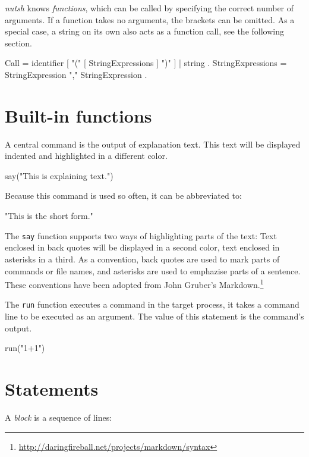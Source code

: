 \documentclass[paper=a4,twoside,abstract=on,cleardoublepage=empty,numbers=noenddot,toc=bib,12pt,appendixprefix=true]{scrreprt}
\begin{document}

\emph{nutsh} knows \emph{functions}, which can be called by specifying the correct number of arguments. If a function takes no arguments, the brackets can be omitted. As a special case, a string on its own also acts as a function call, see the following section.

\begin{ebnf}
Call = identifier [ "(" [ StringExpressions ] ")" ] | string .
StringExpressions = StringExpression { "," StringExpression } .
\end{ebnf}

\section{Built-in functions}

A central command is the output of explanation text. This text will be displayed indented and highlighted in a different color.

\begin{nutsh}
say("This is explaining text.")
\end{nutsh}
%
Because this command is used so often, it can be abbreviated to:

\begin{nutsh}
"This is the short form."
\end{nutsh}
%
The \texttt{say} function supports two ways of highlighting parts of the text: Text enclosed in back quotes will be displayed in a second color, text enclosed in asterisks in a third. As a convention, back quotes are used to mark parts of commands or file names, and asterisks are used to emphazise parts of a sentence. These conventions have been adopted from John Gruber's Markdown.\footnote{\url{http://daringfireball.net/projects/markdown/syntax}}

The \texttt{run} function executes a command in the target process, it takes a command line to be executed as an argument. The value of this statement is the command's output.

\begin{nutsh}
run("1+1")
\end{nutsh}

\section{Statements}
\label{sec:statements}


A \emph{block} is a sequence of lines:
\end{document}
